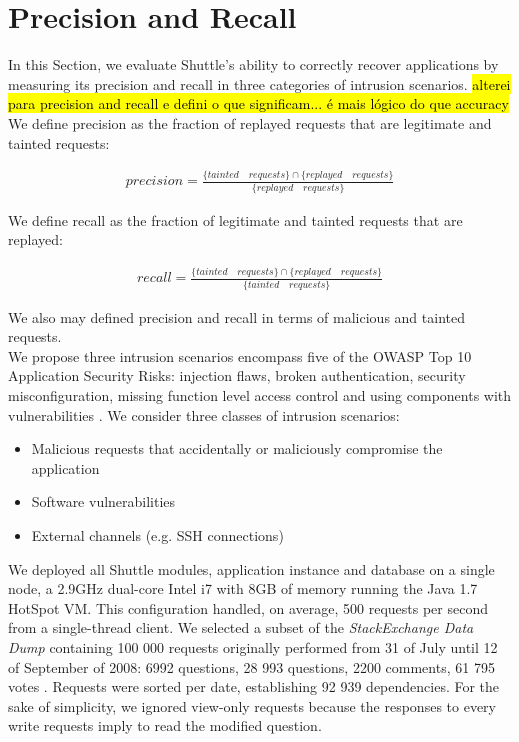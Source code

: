 \section{Precision and Recall}\label{sec:eval:accuracy}

In this Section, we evaluate Shuttle's ability to correctly recover applications by measuring its precision and recall in three categories of intrusion scenarios. \hl{alterei para precision and recall e defini o que significam... é mais lógico do que accuracy}\\

We define precision as the fraction of replayed requests that are legitimate and tainted requests: 

\begin{gather*} 
precision = \frac{ \{tainted \quad requests\} \cap \{replayed \quad requests\}}{\{replayed \quad requests\}}
\end{gather*}

We define recall as the fraction of legitimate and tainted requests that are replayed: 

\begin{gather*} 
recall = \frac{ \{tainted \quad requests\} \cap \{replayed \quad requests\}}{\{tainted \quad requests\}}
\end{gather*}

We also may defined precision and recall in terms of malicious and tainted requests. \\

We propose three intrusion scenarios encompass five of the \ac{OWASP} Top 10 Application Security Risks: injection flaws, broken authentication, security misconfiguration, missing function level access control and using components with vulnerabilities \cite{Williams2013}. We consider three classes of intrusion scenarios:

\begin{itemize}
  \item Malicious requests that accidentally or maliciously compromise the application
  \item Software vulnerabilities
  \item External channels (e.g. \ac{SSH} connections)
\end{itemize}

We deployed all Shuttle modules, application instance and database on a single node, a 2.9GHz dual-core Intel i7 with 8GB of memory running the Java 1.7 HotSpot \ac{VM}. This configuration handled, on average, 500 requests per second from a single-thread client. We selected a subset of the \textit{StackExchange Data Dump} \cite{stackexchange_data} containing 100 000 requests originally performed from 31 of July until 12 of September of 2008: 6992 questions, 28 993 questions, 2200 comments, 61 795 votes . Requests were sorted per date, establishing 92 939 dependencies. For the sake of simplicity, we ignored view-only requests because the responses to every write requests imply to read the modified question.  

